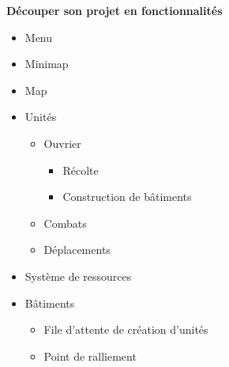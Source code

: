 \documentclass[12pt]{beamer}
\begin{document}
\begin{frame}
    \vspace{1cm}
    {\large \textbf{Découper son projet en fonctionnalités}} \\
    \begin{itemize}
        \pause\item Menu \\
        \pause\item Minimap \\
        \pause\item Map \\
        \pause\item Unités \\
        \begin{itemize}
            \pause\item Ouvrier \\
            \begin{itemize}
                \pause\item Récolte \\
                \pause\item Construction de bâtiments \\
            \end{itemize}
            \pause\item Combats \\
            \pause\item Déplacements \\
        \end{itemize}
        \pause\item Système de ressources \\
        \pause\item Bâtiments \\
        \begin{itemize}
            \pause\item File d'attente de création d'unités \\
            \pause\item Point de ralliement \\
        \end{itemize}
    \end{itemize}
\end{frame}
\end{document}
